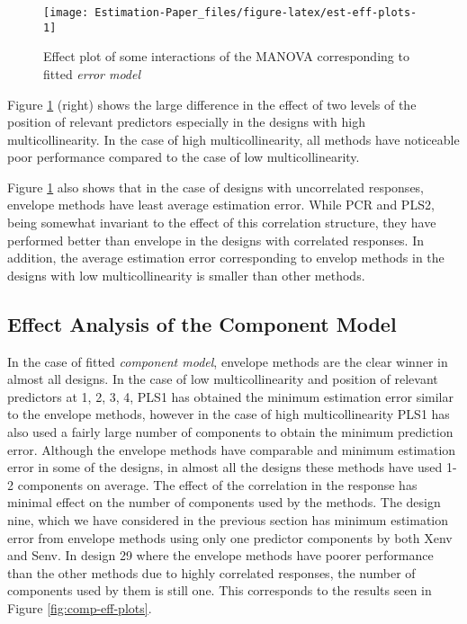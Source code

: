 \documentclass[12pt,3p,authoryear]{elsarticle}
\begin{document}
\begin{figure}
\texttt{[image: Estimation-Paper\_files/figure-latex/est-eff-plots-1]} \caption{Effect plot of some interactions of the MANOVA corresponding to fitted \emph{error model}}\label{fig:est-eff-plots}
\end{figure}

Figure \ref{fig:est-eff-plots} (right) shows the large difference in the effect of two levels of the position of relevant predictors especially in the designs with high multicollinearity. In the case of high multicollinearity, all methods have noticeable poor performance compared to the case of low multicollinearity.

Figure \ref{fig:est-eff-plots} also shows that in the case of designs with uncorrelated responses, envelope methods have least average estimation error. While PCR and PLS2, being somewhat invariant to the effect of this correlation structure, they have performed better than envelope in the designs with correlated responses. In addition, the average estimation error corresponding to envelop methods in the designs with low multicollinearity is smaller than other methods.

\hypertarget{effect-analysis-of-the-component-model}{%
\subsection{Effect Analysis of the Component Model}\label{effect-analysis-of-the-component-model}}

In the case of fitted \emph{component model}, envelope methods are the clear winner in almost all designs. In the case of low multicollinearity and position of relevant predictors at 1, 2, 3, 4, PLS1 has obtained the minimum estimation error similar to the envelope methods, however in the case of high multicollinearity PLS1 has also used a fairly large number of components to obtain the minimum prediction error. Although the envelope methods have comparable and minimum estimation error in some of the designs, in almost all the designs these methods have used 1-2 components on average. The effect of the correlation in the response has minimal effect on the number of components used by the methods. The design nine, which we have considered in the previous section has minimum estimation error from envelope methods using only one predictor components by both Xenv and Senv. In design 29 where the envelope methods have poorer performance than the other methods due to highly correlated responses, the number of components used by them is still one. This corresponds to the results seen in Figure \ref{fig:comp-eff-plots}.
\end{document}

